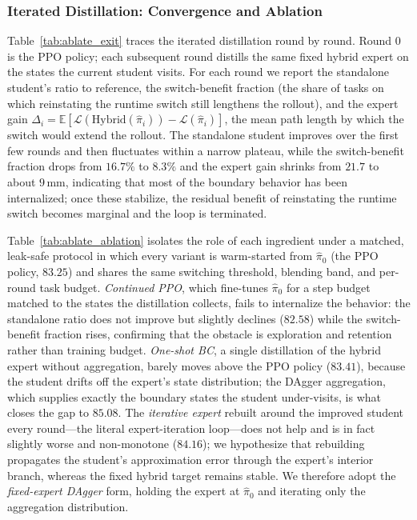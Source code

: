 \documentclass[journal, twoside]{IEEEtran}
\begin{document}
\subsubsection{Iterated Distillation: Convergence and Ablation}
Table~\ref{tab:ablate_exit} traces the iterated distillation round by round. Round $0$ is the PPO policy; each subsequent round distills the same fixed hybrid expert on the states the current student visits. For each round we report the standalone student's ratio to reference, the switch-benefit fraction (the share of tasks on which reinstating the runtime switch still lengthens the rollout), and the expert gain $\Delta_i=\mathbb{E}\!\left[\mathcal{L}(\mathrm{Hybrid}(\hat{\pi}_i))-\mathcal{L}(\hat{\pi}_i)\right]$, the mean path length by which the switch would extend the rollout. The standalone student improves over the first few rounds and then fluctuates within a narrow plateau, while the switch-benefit fraction drops from $16.7\%$ to $8.3\%$ and the expert gain shrinks from $21.7$ to about $9$\,mm, indicating that most of the boundary behavior has been internalized; once these stabilize, the residual benefit of reinstating the runtime switch becomes marginal and the loop is terminated.

Table~\ref{tab:ablate_ablation} isolates the role of each ingredient under a matched, leak-safe protocol in which every variant is warm-started from $\hat{\pi}_{0}$ (the PPO policy, $83.25$) and shares the same switching threshold, blending band, and per-round task budget. \emph{Continued PPO}, which fine-tunes $\hat{\pi}_{0}$ for a step budget matched to the states the distillation collects, fails to internalize the behavior: the standalone ratio does not improve but slightly declines ($82.58$) while the switch-benefit fraction rises, confirming that the obstacle is exploration and retention rather than training budget. \emph{One-shot BC}, a single distillation of the hybrid expert without aggregation, barely moves above the PPO policy ($83.41$), because the student drifts off the expert's state distribution; the DAgger aggregation, which supplies exactly the boundary states the student under-visits, is what closes the gap to $85.08$. The \emph{iterative expert} rebuilt around the improved student every round---the literal expert-iteration loop---does not help and is in fact slightly worse and non-monotone ($84.16$); we hypothesize that rebuilding propagates the student's approximation error through the expert's interior branch, whereas the fixed hybrid target remains stable. We therefore adopt the \emph{fixed-expert DAgger} form, holding the expert at $\hat{\pi}_{0}$ and iterating only the aggregation distribution.
\end{document}
